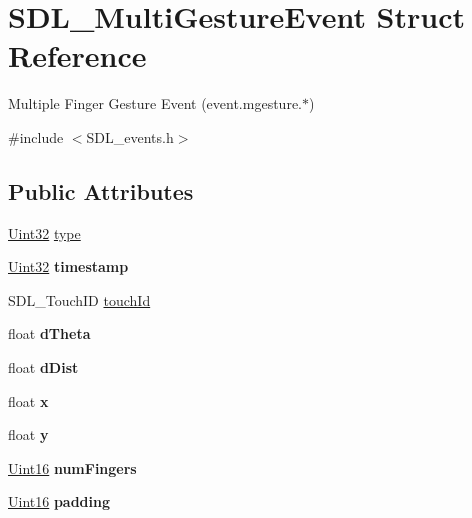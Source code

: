 \hypertarget{struct_s_d_l___multi_gesture_event}{}\section{S\+D\+L\+\_\+\+Multi\+Gesture\+Event Struct Reference}
\label{struct_s_d_l___multi_gesture_event}


Multiple Finger Gesture Event (event.\+mgesture.$\ast$)  




{\ttfamily \#include $<$S\+D\+L\+\_\+events.\+h$>$}

\subsection*{Public Attributes}
\begin{DoxyCompactItemize}
\item 
\hyperlink{_s_d_l__stdinc_8h_add440eff171ea5f55cb00c4a9ab8672d}{Uint32} \hyperlink{struct_s_d_l___multi_gesture_event_ab0c7adc9a3f71cc3532bfe0ff8cc6120}{type}
\item 
\mbox{\label{struct_s_d_l___multi_gesture_event_a7e99a98debf3ce11f6d2a2fbb3637175}} 
\hyperlink{_s_d_l__stdinc_8h_add440eff171ea5f55cb00c4a9ab8672d}{Uint32} {\bfseries timestamp}
\item 
S\+D\+L\+\_\+\+Touch\+ID \hyperlink{struct_s_d_l___multi_gesture_event_aa15d1201559a3c9277082af71a972dc1}{touch\+Id}
\item 
\mbox{\label{struct_s_d_l___multi_gesture_event_a4f4a920dcf5205baa24a140df56f3153}} 
float {\bfseries d\+Theta}
\item 
\mbox{\label{struct_s_d_l___multi_gesture_event_a351c29785c5ce3f68c4591a427265f14}} 
float {\bfseries d\+Dist}
\item 
\mbox{\label{struct_s_d_l___multi_gesture_event_a1708fc3c788fd12cc0beb5dc05cf31ca}} 
float {\bfseries x}
\item 
\mbox{\label{struct_s_d_l___multi_gesture_event_a264602b9c5cc027eb6a283adda428454}} 
float {\bfseries y}
\item 
\mbox{\label{struct_s_d_l___multi_gesture_event_a6b06cf80372ce3cad40110fdb6ef0353}} 
\hyperlink{_s_d_l__stdinc_8h_a31fcc0a076c9068668173ee26d33e42b}{Uint16} {\bfseries num\+Fingers}
\item 
\mbox{\label{struct_s_d_l___multi_gesture_event_a4804ec87789e697aba138c4888bb304b}} 
\hyperlink{_s_d_l__stdinc_8h_a31fcc0a076c9068668173ee26d33e42b}{Uint16} {\bfseries padding}
\end{DoxyCompactItemize}


